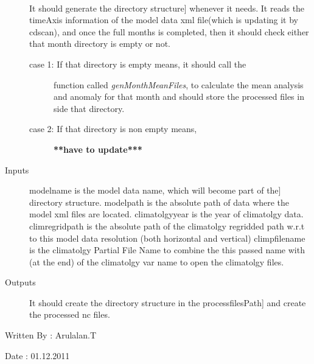 \documentclass[letterpaper,10pt,english]{sphinxmanual}
\begin{document}
\begin{fulllineitems}
\label{diagnosis:compute_month_mean.genMonthMeanDirs}~\begin{description}
\item[{}] \leavevmode{[}It should generate the directory structure{]}
whenever it needs. It reads the timeAxis information of the
model data xml file(which is updating it by cdscan), and once
the full months is completed, then it should check either that
month directory is empty or not.
\begin{description}
\item[{case 1: If that directory is empty means, it should call the}] \leavevmode
function called \emph{genMonthMeanFiles}, to calculate
the mean analysis and anomaly for that month and should
store the processed files in side that directory.

\item[{case 2: If that directory is non empty means,}] \leavevmode
\textbf{**have to update***}

\end{description}

\item[{Inputs}] \leavevmode{[}modelname is the model data name, which will become part of the{]}
directory structure.
modelpath is the absolute path of data where the model xml files
are located.
climatolgyyear is the year of climatolgy data.
climregridpath is the absolute path of the climatolgy regridded
path w.r.t to this model data resolution (both horizontal and
vertical)
climpfilename is the climatolgy Partial File Name to combine the
this passed name with (at the end) of the climatolgy var name to
open the climatolgy files.

\item[{Outputs}] \leavevmode{[}It should create the directory structure in the processfilesPath{]}
and create the processed nc files.

\end{description}

Written By : Arulalan.T

Date : 01.12.2011

\end{fulllineitems}

\end{document}
